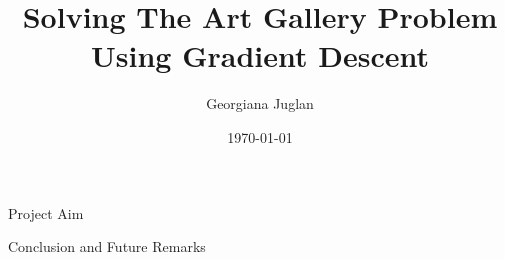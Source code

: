 \documentclass{beamer}
\title{Solving The Art Gallery Problem Using Gradient Descent}
\author{Georgiana Juglan}
\institute{Supervisor: \\ Tillman Miltzow \\ Second Examiner: \\ Frank Staals}
\date{\today}
\begin{document}

\begin{frame}
	\maketitle %
\end{frame}




\begin{frame}{Project Aim}


\end{frame}

% 

% 

%  

% 

% 

% 

\begin{frame}{Conclusion and Future Remarks}
\end{frame}
\end{document}
